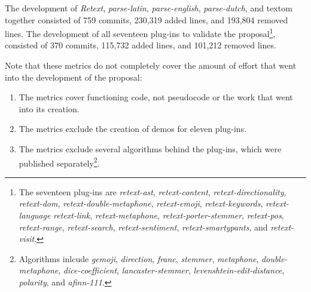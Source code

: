 The development of \emph{Retext}, \emph{parse-latin}, \emph{parse-english},
  \emph{parse-dutch}, and \gls{textom} together consisted of 759 commits,
  230,319 added lines, and 193,804 removed lines.
The development of all seventeen plug-ins to validate the
  proposal\footnote{The seventeen plug-ins are \emph{retext-ast},
    \emph{retext-content},
    \emph{retext-directionality}, \emph{retext-dom},
    \emph{retext-double-metaphone}, \emph{retext-emoji},
    \emph{retext-keywords}, \emph{retext-language}
    \emph{retext-link}, \emph{retext-metaphone},
    \emph{retext-porter-stemmer}, \emph{retext-pos}, \emph{retext-range},
    \emph{retext-search}, \emph{retext-sentiment}, \emph{retext-smartypants},
    and \emph{retext-visit}.},
  consisted of 370 commits, 115,732 added lines, and 101,212 removed lines.

Note that these metrics do not completely cover the amount of effort that
  went into the development of the proposal:

\begin{enumerate}
\item The metrics cover functioning code, not pseudocode or the work that
  went into its creation.
\item The metrics exclude the creation of demos for eleven plug-ins.
\item The metrics exclude several algorithms behind the plug-ins,
  which were published separately\footnote{Algorithms inlcude
    \emph{gemoji}, \emph{direction}, \emph{franc}, \emph{stemmer},
    \emph{metaphone}, \emph{double-metaphone}, \emph{dice-coefficient},
    \emph{lancaster-stemmer}, \emph{levenshtein-edit-distance},
    \emph{polarity}, and \emph{afinn-111}.
  }.
\end{enumerate}



\endgroup
